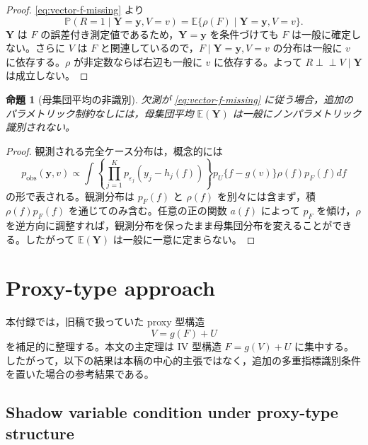\documentclass[10pt,a4paper]{article}
\newtheorem{proposition}{命題}
\newcommand{\indep}{\mathrel{\perp\!\!\!\perp}}
\newcommand{\E}{\mathbb{E}}
\newcommand{\Prb}{\mathbb{P}}
\newcommand{\1}{\mathbf{1}}
\newcommand{\Y}{\bm{Y}}
\begin{document}
\begin{proof}
\eqref{eq:vector-f-missing} より
\begin{equation}
  \Prb(R=1\mid \Y=\bm y,V=v)=\E\{\rho(F)\mid \Y=\bm y,V=v\}.
\end{equation}
$\Y$ は $F$ の誤差付き測定値であるため，$\Y=\bm y$ を条件づけても $F$ は一般に確定しない。さらに $V$ は $F$ と関連しているので，$F\mid \Y=\bm y,V=v$ の分布は一般に $v$ に依存する。$\rho$ が非定数ならば右辺も一般に $v$ に依存する。よって $R\indep V\mid \Y$ は成立しない。
\end{proof}

\begin{proposition}[母集団平均の非識別]
\label{prop:mean-nonid-f-missing}
欠測が \eqref{eq:vector-f-missing} に従う場合，追加のパラメトリック制約なしには，母集団平均 $\E(\Y)$ は一般にノンパラメトリック識別されない。
\end{proposition}

\begin{proof}
観測される完全ケース分布は，概念的には
\begin{equation}
  p_{\mathrm{obs}}(\bm y,v)
  \propto
  \int
    \left\{\prod_{j=1}^K p_{\varepsilon_j}(y_j-h_j(f))\right\}
    p_U\{f-g(v)\}
    \rho(f)p_F(f)df
\end{equation}
の形で表される。観測分布は $p_F(f)$ と $\rho(f)$ を別々には含まず，積 $\rho(f)p_F(f)$ を通じてのみ含む。任意の正の関数 $a(f)$ によって $p_F$ を傾け，$\rho$ を逆方向に調整すれば，観測分布を保ったまま母集団分布を変えることができる。したがって $\E(\Y)$ は一般に一意に定まらない。
\end{proof}

\section{Proxy-type approach}
\label{app:proxy-type}

本付録では，旧稿で扱っていた proxy 型構造
\begin{equation}
  V=g(F)+U
  \label{eq:app-proxy-structure}
\end{equation}
を補足的に整理する。本文の主定理は IV 型構造 $F=g(V)+U$ に集中する。したがって，以下の結果は本稿の中心的主張ではなく，追加の多重指標識別条件を置いた場合の参考結果である。

\subsection{Shadow variable condition under proxy-type structure}
\end{document}
